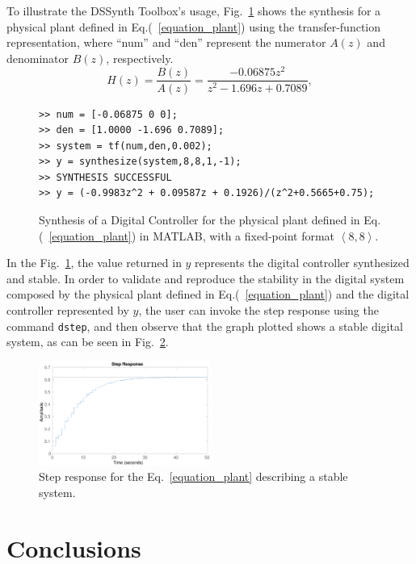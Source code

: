 \documentclass[sigconf]{acmart}
\newcommand\tool{{DSSynth Toolbox}\xspace}
\begin{document}
To illustrate the \tool's usage, Fig.~\ref{toolbox-usage} shows the synthesis for a physical plant defined in Eq.(~\ref{equation_plant}) using the transfer-function representation, where ``num'' and ``den'' represent the numerator $A(z)$ and denominator $B(z)$, respectively.
%
\begin{equation}
\label{equation_plant}
H(z)=\frac{B(z)}{A(z)}=\frac{-0.06875z^{2}}{z^2-1.696z+0.7089},
\end{equation}
%
\begin{figure}[ht]
\scriptsize
\begin{lstlisting}[xleftmargin=.025\textwidth,xrightmargin=.025\textwidth, frame=single,]
>> num = [-0.06875 0 0];
>> den = [1.0000 -1.696 0.7089];
>> system = tf(num,den,0.002);
>> y = synthesize(system,8,8,1,-1);
>> SYNTHESIS SUCCESSFUL
>> y = (-0.9983z^2 + 0.09587z + 0.1926)/(z^2+0.5665+0.75);
\end{lstlisting}
\vspace{-0.2cm}
\caption{Synthesis of a Digital Controller for the physical plant defined in Eq.(~\ref{equation_plant}) in MATLAB, with a fixed-point format  $\left\langle 8,8\right\rangle$.}
\label{toolbox-usage}
\end{figure}
%
In the Fig.~\ref{toolbox-usage}, the value returned in $y$ represents the digital controller synthesized and stable. In order to validate and reproduce the stability in the digital system composed by the physical plant defined in Eq.(~\ref{equation_plant}) and the digital controller represented by $y$, the user can invoke the step response using the command \texttt{dstep}, and then observe that the graph plotted shows a stable digital system, as can be seen in Fig.~\ref{step-response}.
%
\begin{figure}[ht]
  \includegraphics[width=0.5\textwidth]{step-response.eps}
  \caption{Step response for the Eq.~\eqref{equation_plant} describing a stable system.}
  \label{step-response}
\end{figure}


\section{Conclusions}
\end{document}
